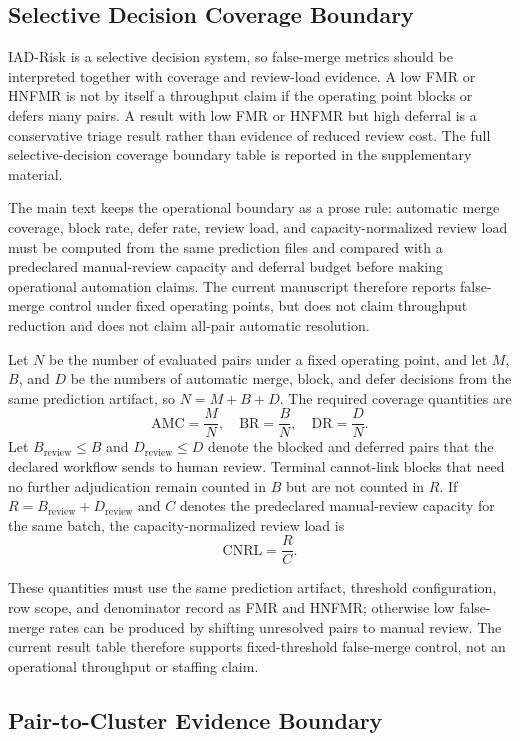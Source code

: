\documentclass[11pt]{article}
\begin{document}
\subsection{Selective Decision Coverage Boundary}

IAD-Risk is a selective decision system, so false-merge metrics should be interpreted together with coverage and review-load evidence. A low FMR or HNFMR is not by itself a throughput claim if the operating point blocks or defers many pairs. A result with low FMR or HNFMR but high deferral is a conservative triage result rather than evidence of reduced review cost. The full selective-decision coverage boundary table is reported in the supplementary material.

The main text keeps the operational boundary as a prose rule: automatic merge coverage, block rate, defer rate, review load, and capacity-normalized review load must be computed from the same prediction files and compared with a predeclared manual-review capacity and deferral budget before making operational automation claims. The current manuscript therefore reports false-merge control under fixed operating points, but does not claim throughput reduction and does not claim all-pair automatic resolution.

Let $N$ be the number of evaluated pairs under a fixed operating point, and let $M$, $B$, and $D$ be the numbers of automatic merge, block, and defer decisions from the same prediction artifact, so $N=M+B+D$. The required coverage quantities are
\[
\mathrm{AMC}=\frac{M}{N},\quad
\mathrm{BR}=\frac{B}{N},\quad
\mathrm{DR}=\frac{D}{N}.
\]
Let $B_{\mathrm{review}}\leq B$ and $D_{\mathrm{review}}\leq D$ denote the blocked and deferred pairs that the declared workflow sends to human review. Terminal cannot-link blocks that need no further adjudication remain counted in $B$ but are not counted in $R$. If $R=B_{\mathrm{review}}+D_{\mathrm{review}}$ and $C$ denotes the predeclared manual-review capacity for the same batch, the capacity-normalized review load is
\[
\mathrm{CNRL}=\frac{R}{C}.
\]

These quantities must use the same prediction artifact, threshold configuration, row scope, and denominator record as FMR and HNFMR; otherwise low false-merge rates can be produced by shifting unresolved pairs to manual review. The current result table therefore supports fixed-threshold false-merge control, not an operational throughput or staffing claim.

\subsection{Pair-to-Cluster Evidence Boundary}
\end{document}
